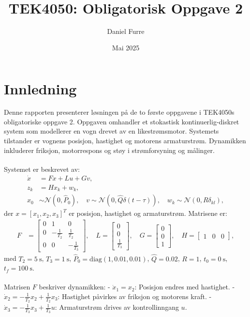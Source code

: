 \documentclass[a4paper,12pt]{article}
\title{TEK4050: Obligatorisk Oppgave 2}
\author{Daniel Furre}
\date{Mai 2025}
\theoremstyle{plain}
\begin{document}
\maketitle
\tableofcontents
\clearpage

\section{Innledning}
Denne rapporten presenterer løsningen på de to første oppgavene i TEK4050s obligatoriske oppgave 2. Oppgaven omhandler et stokastisk kontinuerlig-diskret system som modellerer en vogn drevet av en likestrømsmotor. Systemets tilstander er vognens posisjon, hastighet og motorens armaturstrøm. Dynamikken inkluderer friksjon, motorrespons og støy i strømforsyning og målinger.
\\\\
Systemet er beskrevet av:
\begin{align}
\dot{x} &= F x + L u + G v, \label{eq:state_eq} \\
z_k &= H x_k + w_k, \label{eq:meas_eq} \\
x_0 &\sim \mathcal{N}(0, \hat{P}_0), \quad v \sim \mathcal{N}(0, \hat{Q} \delta(t-\tau)), \quad w_k \sim \mathcal{N}(0, R \delta_{kl}), \label{eq:noise_dist}
\end{align}
der \(x = [x_1, x_2, x_3]^T\) er posisjon, hastighet og armaturstrøm. Matrisene er:
\begin{align*}
F &= \begin{bmatrix}
0 & 1 & 0 \\
0 & -\frac{1}{T_2} & \frac{1}{T_2} \\
0 & 0 & -\frac{1}{T_3}
\end{bmatrix}, \quad
L = \begin{bmatrix}
0 \\ 0 \\ \frac{1}{T_3}
\end{bmatrix}, \quad
G = \begin{bmatrix}
0 \\ 0 \\ 1
\end{bmatrix}, \quad
H = \begin{bmatrix}
1 & 0 & 0
\end{bmatrix},
\end{align*}
med \(T_2 = \SI{5}{\second}\), \(T_3 = \SI{1}{\second}\), \(\hat{P}_0 = \text{diag}(1, 0.01, 0.01)\), \(\hat{Q} = 0.02\), \(R = 1\), \(t_0 = \SI{0}{\second}\), \(t_f = \SI{100}{\second}\).
\\\\
Matrisen \(F\) beskriver dynamikken:
- \(\dot{x}_1 = x_2\): Posisjon endres med hastighet.
- \(\dot{x}_2 = -\frac{1}{T_2} x_2 + \frac{1}{T_2} x_3\): Hastighet påvirkes av friksjon og motorens kraft.
- \(\dot{x}_3 = -\frac{1}{T_3} x_3 + \frac{1}{T_3} u\): Armaturstrøm drives av kontrollinngang \(u\).
\end{document}
